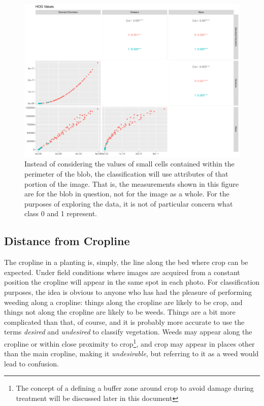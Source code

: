 \documentclass[letterpaper]{article}
\begin{document}
{\begin{figure}[h!]
	\centering
	\includegraphics[width=0.7\linewidth]{./figures/hog-pairs.pdf}
	\caption[HOG features used in classification]{Instead of considering the values of small cells contained within the perimeter of the blob, the classification will use attributes of that portion of the image. That is, the measurements shown in this figure are for the blob in question, not for the image as a whole. For the purposes of exploring the data, it is not of particular concern what class 0 and 1 represent.}
	\label{fig:hog-pairs}
\end{figure}

 

\subsection{Distance from Cropline}
The cropline in a planting is, simply, the line along the bed where crop can be expected. Under field conditions where images are acquired from a constant position the cropline will appear in the same spot in each photo. For classification purposes, the idea is obvious to anyone who has had the pleasure of performing weeding along a cropline: things along the cropline are likely to be crop, and things not along the cropline are likely to be weeds. Things are a bit more complicated than that, of course, and it is probably more accurate to use the terms \textit{desired} and \textit{undesired} to classify vegetation. Weeds may appear along the cropline or within close proximity to crop\footnote{The concept of a defining a buffer zone around crop to avoid damage during treatment will be discussed later in this document}, and crop may appear in places other than the main cropline, making it \textit{undesirable}, but referring to it as a weed would lead to confusion.

}
\end{document}
